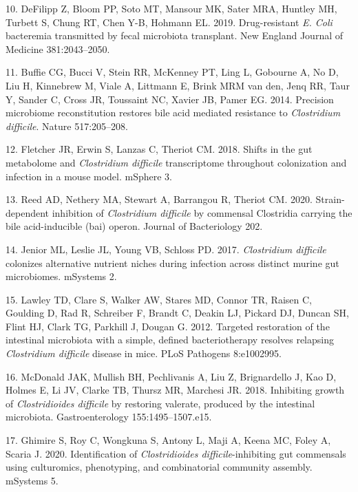 \documentclass[12pt,]{article}
\newlength{\cslhangindent}
\newenvironment{cslreferences}%
  {\setlength{\parindent}{0pt}%
  \everypar{\setlength{\hangindent}{\cslhangindent}}\ignorespaces}%
  {\par}
\begin{document}
\begin{cslreferences}
\leavevmode\hypertarget{ref-defilipp2019}{}%
10. DeFilipp Z, Bloom PP, Soto MT, Mansour MK, Sater MRA, Huntley MH,
Turbett S, Chung RT, Chen Y-B, Hohmann EL. 2019. Drug-resistant \emph{E.
Coli} bacteremia transmitted by fecal microbiota transplant. New England
Journal of Medicine 381:2043--2050.

\leavevmode\hypertarget{ref-buffie2015}{}%
11. Buffie CG, Bucci V, Stein RR, McKenney PT, Ling L, Gobourne A, No D,
Liu H, Kinnebrew M, Viale A, Littmann E, Brink MRM van den, Jenq RR,
Taur Y, Sander C, Cross JR, Toussaint NC, Xavier JB, Pamer EG. 2014.
Precision microbiome reconstitution restores bile acid mediated
resistance to \emph{Clostridium difficile}. Nature 517:205--208.

\leavevmode\hypertarget{ref-fletcher2018}{}%
12. Fletcher JR, Erwin S, Lanzas C, Theriot CM. 2018. Shifts in the gut
metabolome and \emph{Clostridium difficile} transcriptome throughout
colonization and infection in a mouse model. mSphere 3.

\leavevmode\hypertarget{ref-reed2020}{}%
13. Reed AD, Nethery MA, Stewart A, Barrangou R, Theriot CM. 2020.
Strain-dependent inhibition of \emph{Clostridium difficile} by commensal
Clostridia carrying the bile acid-inducible (bai) operon. Journal of
Bacteriology 202.

\leavevmode\hypertarget{ref-jenior2017}{}%
14. Jenior ML, Leslie JL, Young VB, Schloss PD. 2017. \emph{Clostridium
difficile} colonizes alternative nutrient niches during infection across
distinct murine gut microbiomes. mSystems 2.

\leavevmode\hypertarget{ref-lawley2012}{}%
15. Lawley TD, Clare S, Walker AW, Stares MD, Connor TR, Raisen C,
Goulding D, Rad R, Schreiber F, Brandt C, Deakin LJ, Pickard DJ, Duncan
SH, Flint HJ, Clark TG, Parkhill J, Dougan G. 2012. Targeted restoration
of the intestinal microbiota with a simple, defined bacteriotherapy
resolves relapsing \emph{Clostridium difficile} disease in mice. PLoS
Pathogens 8:e1002995.

\leavevmode\hypertarget{ref-mcdonald2018}{}%
16. McDonald JAK, Mullish BH, Pechlivanis A, Liu Z, Brignardello J, Kao
D, Holmes E, Li JV, Clarke TB, Thursz MR, Marchesi JR. 2018. Inhibiting
growth of \emph{Clostridioides difficile} by restoring valerate,
produced by the intestinal microbiota. Gastroenterology
155:1495--1507.e15.

\leavevmode\hypertarget{ref-ghimire2019}{}%
17. Ghimire S, Roy C, Wongkuna S, Antony L, Maji A, Keena MC, Foley A,
Scaria J. 2020. Identification of \emph{Clostridioides
difficile}-inhibiting gut commensals using culturomics, phenotyping, and
combinatorial community assembly. mSystems 5.


\end{cslreferences}
\end{document}
